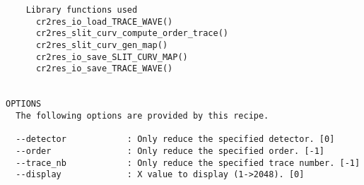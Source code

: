 \begin{verbatim}
    Library functions used                                                
      cr2res_io_load_TRACE_WAVE()                                         
      cr2res_slit_curv_compute_order_trace()                              
      cr2res_slit_curv_gen_map()                                          
      cr2res_io_save_SLIT_CURV_MAP()                                      
      cr2res_io_save_TRACE_WAVE()                                         
  

OPTIONS
  The following options are provided by this recipe.

  --detector            : Only reduce the specified detector. [0]
  --order               : Only reduce the specified order. [-1]
  --trace_nb            : Only reduce the specified trace number. [-1]
  --display             : X value to display (1->2048). [0]

\end{verbatim}
